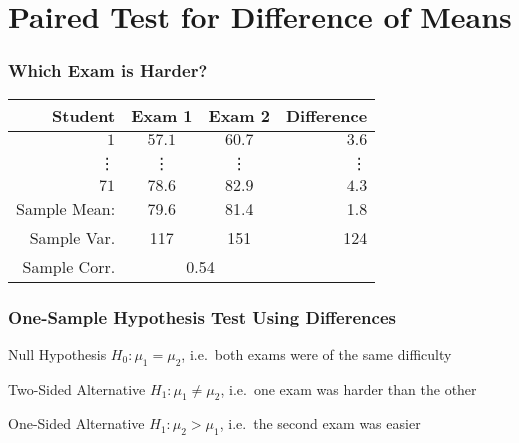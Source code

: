 \section{Paired Test for Difference of Means}
\begin{frame}
\frametitle{Which Exam is Harder?}
%
\begin{table}[!tbp]
\begin{center}
\begin{tabular}{rccr}
\hline\hline
\multicolumn{1}{r}{Student}&\multicolumn{1}{c}{Exam 1}&\multicolumn{1}{c}{Exam 2}&\multicolumn{1}{r}{Difference}\tabularnewline
\hline
$ 1$&$57.1$&$60.7$&$  3.6$\tabularnewline
\vdots&\vdots&\vdots&\vdots\\
$71$&$78.6$&$82.9$&$  4.3$\tabularnewline
\hline
Sample Mean: & 79.6 & 81.4  &1.8\\
Sample Var. &117  & 151 & 124\\
Sample Corr.& \multicolumn{2}{c}{0.54}&\\
\hline
\end{tabular}
\end{center}
\end{table}

\vspace{1em}

\end{frame}
\begin{frame}
\frametitle{One-Sample Hypothesis Test Using Differences}
\small
{}
\vspace{0.1em}
\begin{block}{Null Hypothesis}
$H_0\colon \mu_1 = \mu_2$, i.e.\ both exams were of the same difficulty
\end{block}
\begin{block}{Two-Sided Alternative}
$H_1\colon \mu_1 \neq \mu_2$, i.e.\ one exam was harder than the other
\end{block}
\begin{block}{One-Sided Alternative}
$H_1\colon \mu_2 > \mu_1$, i.e.\ the second exam was easier
\end{block}
\end{frame}

